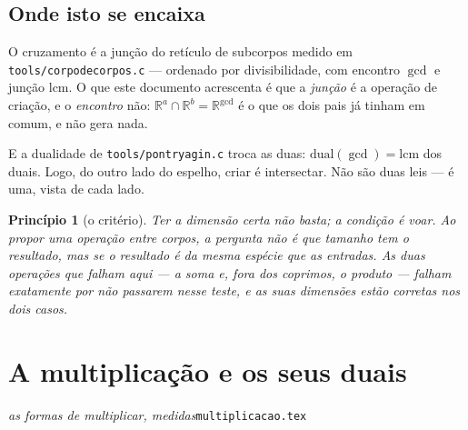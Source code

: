 \documentclass[11pt]{article}
\newcommand{\code}[1]{\texttt{\small #1}}
\newcommand{\R}{\mathbb R}
\theoremstyle{plain}
\newtheorem{principio}{Princípio}
\theoremstyle{remark}
\begin{document}
\subsection{Onde isto se encaixa}

O cruzamento é a junção do retículo de subcorpos medido em \code{tools/corpodecorpos.c} --- ordenado
por divisibilidade, com encontro $\gcd$ e junção $\mathrm{lcm}$. O que este documento acrescenta é que
a \emph{junção} é a operação de criação, e o \emph{encontro} não: $\R^a\cap\R^b=\R^{\gcd}$ é o que os
dois pais já tinham em comum, e não gera nada.

E a dualidade de \code{tools/pontryagin.c} troca as duas: $\mathrm{dual}(\gcd)=\mathrm{lcm}$ dos
duais. Logo, do outro lado do espelho, criar é intersectar. Não são duas leis --- é uma, vista de
cada lado.

\begin{principio}[o critério]
\emph{Ter a dimensão certa não basta; a condição é voar.} Ao propor uma operação entre corpos, a
pergunta não é que tamanho tem o resultado, mas se o resultado é da mesma espécie que as entradas. As
duas operações que falham aqui --- a soma e, fora dos coprimos, o produto --- falham exatamente por
não passarem nesse teste, e as suas dimensões estão corretas nos dois casos.
\end{principio}



\section{A multiplicação e os seus duais}

\noindent\emph{as formas de multiplicar, medidas}\hfill\code{multiplicacao.tex}



\begin{abstract}
\noindent A multiplicação do corpo autossimilar $\R^n$ escreve-se em \textbf{quatro peças}, e
delas só uma carrega a dimensão. As outras três --- a coordenada real, o produto interno e a parte
imaginária --- existem em toda dimensão e não mudam de forma. A quarta é o \textbf{produto
cruzado}, e é nela que fica a recursão: é ela que decide se o corpo comuta, se associa, e onde a
torre acaba. Os dois produtos --- \emph{direto} e \emph{cruzado} --- não são duas construções
avulsas: são as \textbf{duas metades} da decomposição de um bilinear qualquer em parte simétrica e
antissimétrica. E o mesmo par, uma escala acima, é a soma e a multiplicação do \emph{corpo de
corpos}. O que a dimensão $1,3,7$ limita é a \emph{norma multiplicativa}, e não a álgebra: no
espaço paramétrico $(p,r,t,s)$ os corpos clássicos são pontos especiais de um contínuo.
\emph{Quase} tudo o que aqui se afirma está medido, com o medidor indicado --- e o que
não está, por ser resultado conhecido da literatura, vai marcado como tal. A convenção que separa
os dois casos abre o texto, porque é ela que diz o peso de cada enunciado.
\end{abstract}
\end{document}
